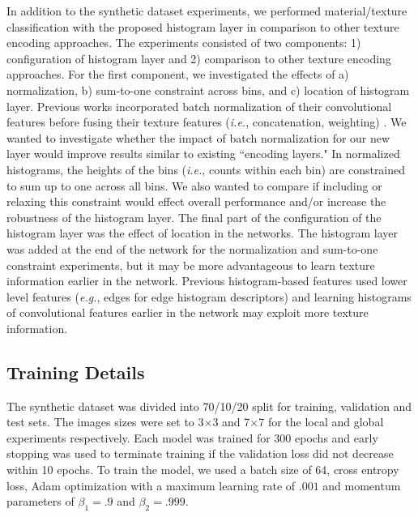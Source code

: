 \documentclass[journal]{IEEEtai}
\begin{document}
	In addition to the synthetic dataset experiments, we performed material/texture classification with the proposed histogram layer in comparison to other texture encoding approaches. The experiments consisted of two components: 1) configuration of histogram layer and 2) comparison to other texture encoding approaches. For the first component, we investigated the effects of a) normalization, b) sum-to-one constraint across bins, and c) location of histogram layer. Previous works incorporated batch normalization of their convolutional features before fusing their texture features (\textit{i.e.}, concatenation, weighting) \cite{hu2019multi,xue2018deep,zhang2017deep}. We wanted to investigate whether the impact of batch normalization for our new layer would improve results similar to existing ``encoding layers." In normalized histograms, the heights of the bins (\textit{i.e.}, counts within each bin) are constrained to sum up to one across all bins. We also wanted to compare if including or relaxing this constraint would effect overall performance and/or increase the robustness of the histogram layer. The final part of the configuration of the histogram layer was the effect of location in the networks. The histogram layer was added at the end of the network for the normalization and sum-to-one constraint experiments, but it may be more advantageous to learn texture information earlier in the network. Previous histogram-based features used lower level features (\textit{e.g.}, edges \cite{frigui2008detection} for edge histogram descriptors) and learning histograms of convolutional features earlier in the network may exploit more texture information.
	
	\subsection{Training Details}
	The synthetic dataset was divided into 70/10/20 split for training, validation and test sets. The images sizes were set to 3$\times$3 and 7$\times$7 for the local and global experiments respectively. Each model was trained for 300 epochs and early stopping was used to terminate training if the validation loss did not decrease within 10 epochs. To train the model, we used a batch size of 64, cross entropy loss, Adam optimization with a maximum learning rate of $.001$ and momentum parameters of $\beta_{1}= .9$ and $\beta_{2}= .999$.
	
\end{document}
